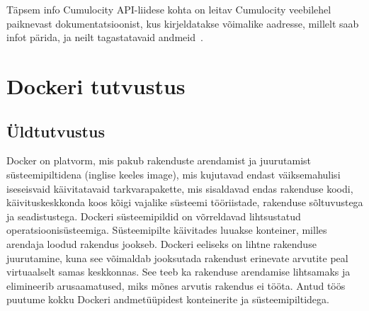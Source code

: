 \documentclass[12pt]{article}
\newcommand{\newlinespacer}{{%
    \newline
    \newline
  }}%
\begin{document}
  \FloatBarrier

  Täpsem info Cumulocity API-liidese kohta on leitav Cumulocity veebilehel paiknevast dokumentatsioonist,
  kus kirjeldatakse võimalike aadresse, millelt saab infot pärida, ja neilt tagastatavaid
  andmeid~\cite{cumulocityRestDocumentation}.




  





  
  
  
  \newpage
  \section{Dockeri tutvustus}

  \subsection{Üldtutvustus}
  Docker on platvorm, mis pakub rakenduste arendamist ja juurutamist süsteemipiltidena
  (inglise keeles image), mis kujutavad endast väiksemahulisi iseseisvaid käivitatavaid tarkvarapakette,
  mis sisaldavad endas rakenduse koodi, käivituskeskkonda koos kõigi vajalike süsteemi
  tööriistade, rakenduse sõltuvustega ja seadistustega. Dockeri süsteemipildid on võrreldavad
  lihtsustatud operatsioonisüsteemiga. Süsteemipilte käivitades luuakse konteiner,
  milles arendaja loodud rakendus jookseb.
  \newlinespacer
  Dockeri eeliseks on lihtne rakenduse juurutamine, kuna see võimaldab jooksutada rakendust
  erinevate arvutite peal virtuaalselt samas keskkonnas. See teeb ka rakenduse arendamise
  lihtsamaks ja elimineerib arusaamatused, miks mõnes arvutis rakendus ei tööta.
  \newlinespacer
  Antud töös puutume kokku Dockeri andmetüüpidest konteinerite ja süsteemipiltidega.
\end{document}
